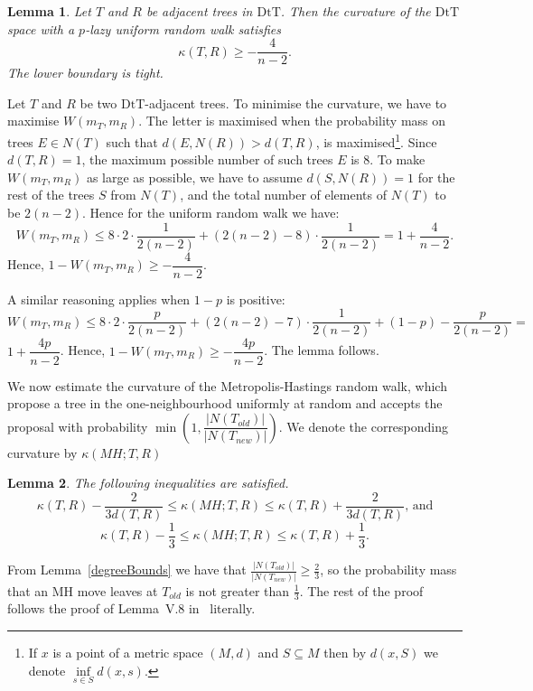 \documentclass{amsart}
\newtheorem{lemma}{Lemma}
\newcommand{\dts}{\mathrm{DtT}}
\begin{document}
\begin{lemma}\label{uniformLower}
Let $T$ and $R$ be adjacent trees in $\dts$. Then the curvature of the $\dts$
space with a $p$-lazy uniform random walk satisfies
\[
\kappa(T,R) \geq -\frac{4}{n-2}.
\]
The lower boundary is tight. 
\end{lemma}

\proof
Let $T$ and $R$ be two $\dts$-adjacent trees. To minimise the curvature, we have
to maximise $W(m_T, m_R)$. The letter is maximised when the probability mass
on trees $E\in N(T)$ such that $d(E, N(R)) > d(T, R)$, is 
maximised\footnote{If $x$ is a point of a metric space $(M,d)$ and 
$S \subseteq M$ then by $d(x,S)$ we denote $\inf\limits_{s \in S} d(x,s)$.}. 
Since $d(T, R) = 1$, the maximum possible number of such trees $E$ is 
$8$. To make $W(m_T,m_R)$ as large as possible, we have to assume 
$d(S, N(R)) = 1$ for the rest of the trees $S$ from $N(T)$, and the
total number of elements of $N(T)$ to be $2(n-2)$.
Hence for the uniform random walk we have: 
\[
W(m_T,m_R)\leq 8 \cdot 2 \cdot \frac{1}{2(n - 2)} +
(2(n - 2) - 8) \cdot \frac{1}{2(n-2)} = 1 + \dfrac{4}{n-2}.
\]
Hence, $1 - W(m_T,m_R) \geq - \dfrac{4}{n-2}$. 

A similar reasoning applies when $1-p$ is positive:
\[
W(m_T,m_R)\leq 8 \cdot 2 \cdot \frac{p}{2(n - 2)} + 
(2(n - 2) - 7) \cdot \frac{1}{2(n-2)} + (1-p) - \frac{p}{2(n-2)} =
\]
$1 + \dfrac{4p}{n-2}$. Hence, 
$1 - W(m_T,m_R) \geq - \dfrac{4p}{n-2}$. The lemma follows. 
\endproof

We now estimate the curvature of the Metropolis-Hastings random walk, which 
propose a tree in the one-neighbourhood uniformly at random and 
accepts the proposal with probability 
$\min(1, \dfrac{|N(T_{old})|}{|N(T_{new})|})$. We denote the corresponding 
curvature by $\kappa(MH;T,R)$

\begin{lemma}
The following inequalities are satisfied. 
\[
\kappa(T,R) - \dfrac{2}{3d(T,R)} \leq \kappa(MH;T,R) \leq \kappa(T,R) +
\dfrac{2}{3d(T,R)}\mbox{, and}
\]
\[
\kappa(T,R) - \dfrac13 \leq \kappa(MH;T,R) \leq \kappa(T,R) + \dfrac13.
\]
\end{lemma}

\proof
From Lemma~\ref{degreeBounds} we have that 
$\frac{|N(T_{old})|}{|N(T_{new})|} \geq \frac{2}{3}$, so the probability 
mass that an MH move leaves at $T_{old}$ is not greater than $\frac13$. 
The rest of the
proof follows the proof of Lemma~V.8 in~\cite{Whidden2015-es} literally. 
\endproof
\end{document}
